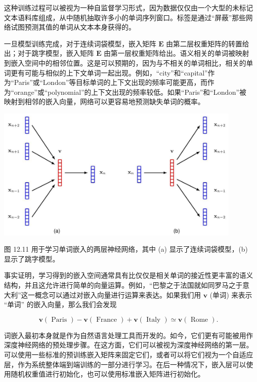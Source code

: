 \documentclass[10pt]{report}
\begin{document}
这种训练过程可以被视为一种自监督学习形式，因为数据仅仅由一个大型的未标记文本语料库组成，从中随机抽取许多小的单词序列窗口。标签是通过“屏蔽”那些网络试图预测其值的单词从文本本身获得的。

一旦模型训练完成，对于连续词袋模型，嵌入矩阵 \(\mathbf{E}\) 由第二层权重矩阵的转置给出；对于跳字模型，嵌入矩阵 \(\mathbf{E}\) 由第一层权重矩阵给出。语义相关的单词被映射到嵌入空间中的相邻位置。这是可以预期的，因为与不相关的单词相比，相关的单词更有可能与相似的上下文单词一起出现。例如，“city”和“capital”作为“Paris”或“London”等目标单词的上下文出现的频率可能更高，而作为“orange”或“polynomial”的上下文出现的频率较低。如果“Paris”和“London”被映射到相邻的嵌入向量，网络可以更容易地预测缺失单词的概率。

\begin{center}
\includegraphics[max width=0.9\textwidth]{images/0194e279-9b28-703a-88f4-c3ac21e2010d_395_288_341_1171_638_0.jpg}
\end{center}
\hspace*{3em} 

图 12.11 用于学习单词嵌入的两层神经网络，其中 (a) 显示了连续词袋模型，(b) 显示了跳字模型。

事实证明，学习得到的嵌入空间通常具有比仅仅是相关单词的接近性更丰富的语义结构，并且这允许进行简单的向量运算。例如，“巴黎之于法国就如同罗马之于意大利”这一概念可以通过对嵌入向量进行运算来表达。如果我们用 \(\mathbf{v}\) (单词) 来表示 “单词” 的嵌入向量，那么我们会发现

\[
\mathbf{v}\left( \text{ Paris }\right)  - \mathbf{v}\left( \text{ France }\right)  + \mathbf{v}\left( \text{ Italy }\right)  \simeq  \mathbf{v}\left( \text{ Rome }\right) . \tag{12.27}
\]

词嵌入最初本身就是作为自然语言处理工具而开发的。如今，它们更有可能被用作深度神经网络的预处理步骤。在这方面，它们可以被视为深度神经网络的第一层。可以使用一些标准的预训练嵌入矩阵来固定它们，或者可以将它们视为一个自适应层，作为系统整体端到端训练的一部分进行学习。在后一种情况下，嵌入层可以使用随机权重值进行初始化，也可以使用标准嵌入矩阵进行初始化。
\end{document}
